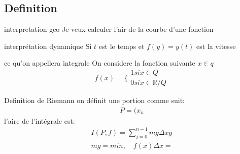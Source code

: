 \subsection{Definition}
\begin{definition}{interpretation geo}
	Je veux calculer l'air de la courbe d'une fonction
\end{definition}
\begin{definition}{interprétation dynamique}
	Si $t$ est le temps et $f(y)=y(t)$ est la vitesse
\end{definition}

\begin{definition}{ce qu'on appellera integrale}
	On considere la fonction suivante $x \in q$
	$$
		f(x)=\{
			\begin{array}{ll}
			1 si x \in Q \\
			0 si x \in \mathbb{R}/Q
			\end{array}
	$$
\end{definition}

\begin{definition}{Definition de Riemann}
	on définit une portion comme suit:
	\begin{align*}
		P= (x_n
	\end{align*}
	l'aire de l'intégrale est:
	\begin{align*}
		I(P,f) = \sum_{j=0}^{n-1} mg \Delta xg \\
		mg=min, \quad f(x) \Delta x = 
	\end{align*}
\end{definition}
